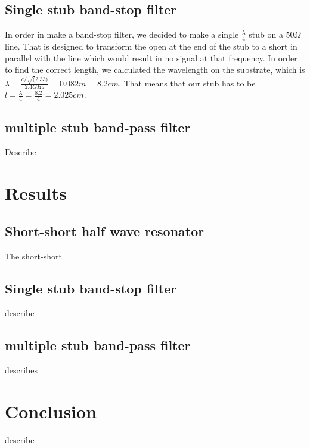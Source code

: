 \documentclass[letterpaper, 12pt]{article}
\begin{document}

\subsection{Single stub band-stop filter}
In order in make a band-stop filter, we decided to make a single \(\frac{\lambda}{4}\) stub on a \(50 \Omega\) line. That is designed to transform the open at the end of the stub to a short in parallel with the line which would result in no signal at that frequency. In order to find the correct length, we calculated the wavelength on the substrate, which is \(\lambda=\frac{c/\sqrt(2.33)}{2.4GHz}=0.082m=8.2cm\). That means that our stub has to be \(l=\frac{\lambda}{4}=\frac{8.2}{4}=2.025cm\).
\subsection{multiple stub band-pass filter}
Describe
\section{Results}

\subsection{Short-short half wave resonator}
The short-short 


\subsection{Single stub band-stop filter}
describe
\subsection{multiple stub band-pass filter}
describes

\section{Conclusion}
describe
\end{document}
